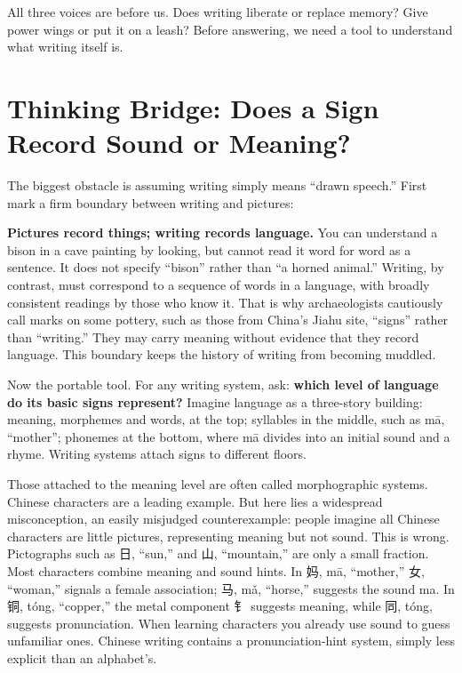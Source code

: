 All three voices are before us. Does writing liberate or replace memory? Give power wings or put it on a leash? Before answering, we need a tool to understand what writing itself is.

\section[Thinking Bridge: Sound or Meaning?]{Thinking Bridge: Does a Sign Record Sound or Meaning?}
The biggest obstacle is assuming writing simply means ``drawn speech.'' First mark a firm boundary between writing and pictures:

\textbf{Pictures record things; writing records language.} You can understand a bison in a cave painting by looking, but cannot read it word for word as a sentence. It does not specify ``bison'' rather than ``a horned animal.'' Writing, by contrast, must correspond to a sequence of words in a language, with broadly consistent readings by those who know it. That is why archaeologists cautiously call marks on some pottery, such as those from China's Jiahu site, ``signs'' rather than ``writing.'' They may carry meaning without evidence that they record language. This boundary keeps the history of writing from becoming muddled.

Now the portable tool. For any writing system, ask: \textbf{which level of language do its basic signs represent?} Imagine language as a three-story building: meaning, morphemes and words, at the top; syllables in the middle, such as mā, ``mother''; phonemes at the bottom, where mā divides into an initial sound and a rhyme. Writing systems attach signs to different floors.

Those attached to the meaning level are often called morphographic systems. Chinese characters are a leading example. But here lies a widespread misconception, an easily misjudged counterexample: people imagine all Chinese characters are little pictures, representing meaning but not sound. This is wrong. Pictographs such as \mbox{日}, ``sun,'' and \mbox{山}, ``mountain,'' are only a small fraction. Most characters combine meaning and sound hints. In \mbox{妈}, mā, ``mother,'' \mbox{女}, ``woman,'' signals a female association; \mbox{马}, mǎ, ``horse,'' suggests the sound ma. In \mbox{铜}, tóng, ``copper,'' the metal component \mbox{钅} suggests meaning, while \mbox{同}, tóng, suggests pronunciation. When learning characters you already use sound to guess unfamiliar ones. Chinese writing contains a pronunciation-hint system, simply less explicit than an alphabet's.

